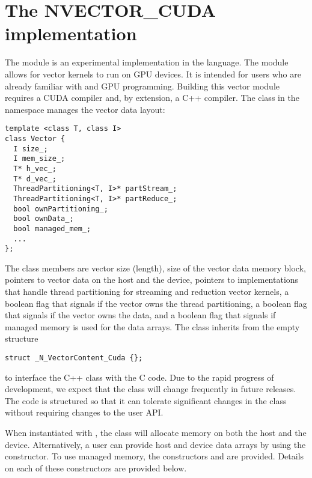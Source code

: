%
\section{The NVECTOR\_CUDA implementation}\label{ss:nvec_cuda}

The {\nveccuda} module is an experimental {\nvector} implementation in the {\cuda} language.
The module allows for {\sundials} vector kernels to run on GPU devices. It is intended for users
who are already familiar with {\cuda} and GPU programming. Building this vector
module requires a CUDA compiler and, by extension, a C++ compiler. The class 
in the namespace  manages the vector data layout:

\begin{verbatim}
template <class T, class I>
class Vector {
  I size_;
  I mem_size_;
  T* h_vec_;
  T* d_vec_;
  ThreadPartitioning<T, I>* partStream_;
  ThreadPartitioning<T, I>* partReduce_;
  bool ownPartitioning_;
  bool ownData_;
  bool managed_mem_;
  ...
};
\end{verbatim}

The class members are vector size (length), size of the vector data memory
block, pointers to vector data on the host and the device, pointers
to  implementations that handle thread partitioning for
streaming and reduction vector kernels, a boolean flag that signals if the
vector owns the thread partitioning, a boolean flag that signals if the vector
owns the data, and a boolean flag that signals if managed memory is used for the
data arrays. The class  inherits from the empty structure
\begin{verbatim}
struct _N_VectorContent_Cuda {};
\end{verbatim}
to interface the C++ class with the {\nvector} C code. Due to the rapid progress
of {\cuda} development, we expect that the  class will
change frequently in future {\sundials} releases. The code is structured so that
it can tolerate significant changes in the  class without
requiring changes to the user API.

When instantiated with , the class  will allocate
memory on both the host and the device. Alternatively, a user can provide host
and device data arrays by using the  constructor. To use {\cuda}
managed memory, the constructors  and \newline
{} are provided. Details on each of these constructors
are provided below.

